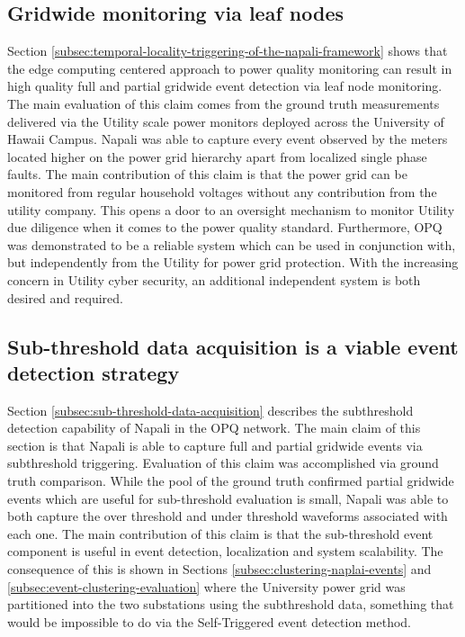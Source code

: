\subsection{Gridwide monitoring via leaf nodes}\label{subsec:conc:gridwide-monitoring-via-leaf-nodes}
Section \ref{subsec:temporal-locality-triggering-of-the-napali-framework} shows that the edge computing centered approach to power quality monitoring can result in high quality
full and partial gridwide event detection via leaf node monitoring.
The main evaluation of this claim comes from the ground truth measurements delivered via the Utility scale power monitors deployed across the University of Hawaii Campus.
Napali was able to capture every event observed by the meters located higher on the power grid hierarchy apart from localized single phase faults.
The main contribution of this claim is that the power grid can be monitored from regular household voltages without any contribution from the utility company.
This opens a door to an oversight mechanism to monitor Utility due diligence when it comes to the power quality standard.
Furthermore, OPQ was demonstrated to be a reliable system which can be used in conjunction with, but independently from the Utility for power grid protection.
With the increasing concern in Utility cyber security, an additional independent system is both desired and required.

\subsection{Sub-threshold data acquisition is a viable event detection strategy}\label{subsec:conc:sub-threshold-data-acquisition}
Section \ref{subsec:sub-threshold-data-acquisition} describes the subthreshold detection capability of Napali in the OPQ network.
The main claim of this section is that Napali is able to capture full and partial gridwide events via subthreshold triggering.
Evaluation of this claim was accomplished via ground truth comparison.
While the pool of the ground truth confirmed partial gridwide events which are useful for sub-threshold evaluation is small,
Napali was able to both capture the over threshold and under threshold waveforms associated with each one.
The main contribution of this claim is that the sub-threshold event component is useful in event detection, localization and system scalability.
The consequence of this is shown in Sections \ref{subsec:clustering-naplai-events} and \ref{subsec:event-clustering-evaluation}
where the University power grid was partitioned into the two substations using the subthreshold data, something that would be impossible to do via the Self-Triggered event detection method.

